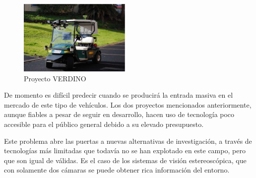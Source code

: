 \begin{figure}
  \vspace{-20pt}
  \begin{center}
    \includegraphics[width=0.48\textwidth]{images/cap1/Verdino.eps}
  \end{center}
  \vspace{-20pt}
  \caption{Proyecto VERDINO}
  \vspace{-10pt}
  \label{fig:ProyectoVERDINO}
\end{figure}

De momento es difícil predecir cuando se producirá la entrada masiva en el
mercado de este tipo de vehículos. Los dos proyectos mencionados anteriormente,
aunque fiables a pesar de seguir en desarrollo, hacen uso de tecnología poco
accesible para el público general debido a su elevado presupuesto.

Este problema abre las puertas a nuevas alternativas de investigación, a través
de tecnologías más limitadas que todavía no se han explotado en este campo, pero
que son igual de válidas. Es el caso de los sistemas de visión estereoscópica,
que con solamente dos cámaras se puede obtener rica información del entorno.

